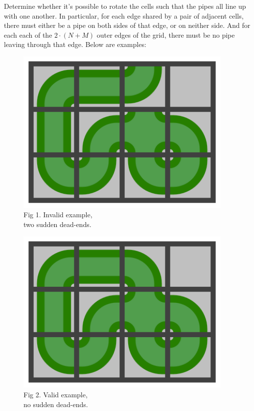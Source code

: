 Determine whether it's possible to rotate the cells such that the pipes all line up with one another. In particular, for each edge shared by a pair of adjacent cells, there must either be a pipe on both sides of that edge, or on neither side. And for each each of the $2 \cdot (N + M)$ outer edges of the grid, there must be no pipe leaving through that edge. Below are examples:

\begin{figure}[h]
  \centering
  \begin{minipage}[t]{0.3\textwidth}\centering
      \includegraphics[width=0.95\textwidth]{pipe_rotation_2}
      Fig 1. Invalid example,\\ two sudden dead-ends.
  \end{minipage}
  \hspace{30pt}
  \begin{minipage}[t]{0.3\textwidth}\centering
      \includegraphics[width=0.95\textwidth]{pipe_rotation_3}
      Fig 2. Valid example,\\ no sudden dead-ends.
  \end{minipage}
\end{figure}


